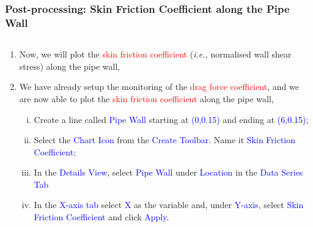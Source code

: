 \documentclass[10pt,compress, unknownkeysallowed]{beamer}
\newcommand{\frc}{\displaystyle\frac}
\newcommand{\red}{\textcolor{red}}
\newcommand{\blue}{\textcolor{blue}}
\newcommand{\ie}{{\it i.e., }}
\begin{document}
\begin{frame}
  \frametitle{Post-processing: Skin Friction Coefficient along the Pipe Wall}
    \begin{columns}
        \begin{column}[l]{0.5\linewidth}
           \begin{enumerate}\scriptsize%
               \item<1-> Now, we will plot the \red{skin friction coefficient} (\ie normalised wall shear stress) along the pipe wall,
                   \visible<1->{\begin{displaymath}
                      c_{f} = \frc{\tau_{w}}{0.5\rho_{\text{ref}}U^{2}_{\text{ref}}}
                   \end{displaymath}}
               \item<2-> We have already setup the monitoring of the \red{drag force coefficient}, and we are now able to plot the \red{skin friction coefficient} along the pipe wall,
                    \begin{enumerate}[i)]\scriptsize
                       \item<2-> Create a line called \blue{Pipe Wall} starting at \blue{(0,0.15)} and ending at \blue{(6,0.15)};
                       \item<2-> Select the \blue{Chart Icon} from the \blue{Create Toolbar}. Name it \blue{Skin Friction Coefficient};
                       \item<2-> In the \blue{Details View}, select \blue{Pipe Wall} under \blue{Location} in the \blue{Data Series Tab}
                       \item<2-> In the \blue{X-axis tab} select \blue{X} as the variable and, under \blue{Y-axis}, select \blue{Skin Friction Coefficient} and click \blue{Apply}.
                    \end{enumerate}


\end{enumerate}
\end{column}
\end{columns}
\end{frame}
\end{document}

